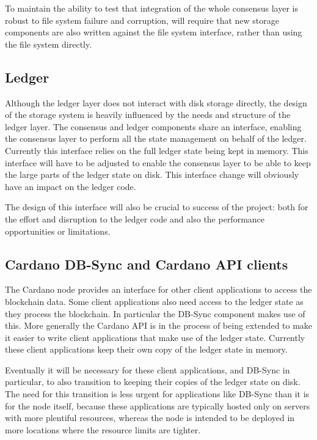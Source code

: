 \documentclass[11pt,a4paper]{article}
\begin{document}
To maintain the ability to test that integration of the whole consensus layer
is robust to file system failure and corruption, will require that new storage
components are also written against the file system interface, rather than using
the file system directly.

\subsection{Ledger}

Although the ledger layer does not interact with disk storage directly, the
design of the storage system is heavily influenced by the needs and structure
of the ledger layer. The consensus and ledger components share an interface,
enabling the consensus layer to perform all the state management on behalf of
the ledger. Currently this interface relies on the full ledger state being kept
in memory. This interface will have to be adjusted to enable the consensus
layer to be able to keep the large parts of the ledger state on disk. This
interface change will obviously have an impact on the ledger code.

The design of this interface will also be crucial to success of the project:
both for the effort and disruption to the ledger code and also the performance
opportunities or limitations.

\subsection{Cardano DB-Sync and Cardano API clients}

The Cardano node provides an interface for other client applications to access
the blockchain data. Some client applications also need access to the ledger
state as they process the blockchain. In particular the DB-Sync component
makes use of this. More generally the Cardano API is in the process of being
extended to make it easier to write client applications that make use of the
ledger state. Currently these client applications keep their own copy of the
ledger state in memory.

Eventually it will be necessary for these client applications, and DB-Sync in
particular, to also transition to keeping their copies of the ledger state on
disk. The need for this transition is less urgent for applications like DB-Sync
than it is for the node itself, because these applications are typically hosted
only on servers with more plentiful resources, whereas the node is intended to
be deployed in more locations where the resource limits are tighter.
\end{document}

